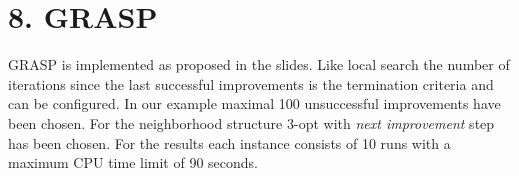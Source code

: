\section*{8. GRASP}
GRASP is implemented as proposed in the slides. Like local search the number of iterations since the last successful improvements is the termination criteria and can be configured. In our example maximal 100 unsuccessful improvements have been chosen. For the neighborhood structure 3-opt with \textit{next improvement} step has been chosen. For the results each instance consists of 10 runs with a maximum CPU time limit of 90 seconds.

